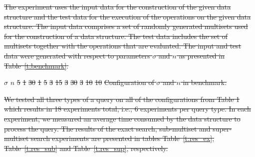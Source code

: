 \documentclass[10pt,letterpaper]{article}
\providecommand{\DIFdeltex}[1]{{\protect\color{red}\sout{#1}}}                      %
\providecommand{\DIFdelFL}[1]{\DIFdel{#1}} %
\providecommand{\DIFdel}[1]{\texorpdfstring{\DIFdeltex{#1}}{}} %
\begin{document}
\DIFdel{The experiment uses the input data for the construction of the given data structure and the test data for the execution of the operations on the given data structure. The input data comprises a set of randomly generated multisets used for the construction of a data structure. The test data includes the set of multisets together with the operations that are evaluated. The input and test data were generated with respect to parameters $\sigma$ and $n$ as presented in Table~\ref{t:benchmark}.
}%

\DIFdelFL{$\sigma$ }%
\DIFdelFL{$n$ }%
\DIFdelFL{5		}%
\DIFdelFL{1}%
\DIFdelFL{30	}%
\DIFdelFL{1 }%
\DIFdelFL{5		}%
\DIFdelFL{3 }%
\DIFdelFL{15	}%
\DIFdelFL{3 }%
\DIFdelFL{30	}%
\DIFdelFL{3 }%
\DIFdelFL{10	}%
\DIFdelFL{10 }%
{%
\DIFdelFL{Configuration of $\sigma$ and $n$ in benchmark.}}

\DIFdel{We tested all three types of a query on all of the configurations from Table 1 which results in 18 experiments total, i.e., 6 experiments per query type. In each experiment, we measured an average time consumed by the data structure to process the query. The results of the exact search, sub-multiset and super-multiset search experiments are presented in tables Table~\ref{t:res_ex}, Table~\ref{t:res_sub} and Table~\ref{t:res_sup}, respectively.
}%
\end{document}
